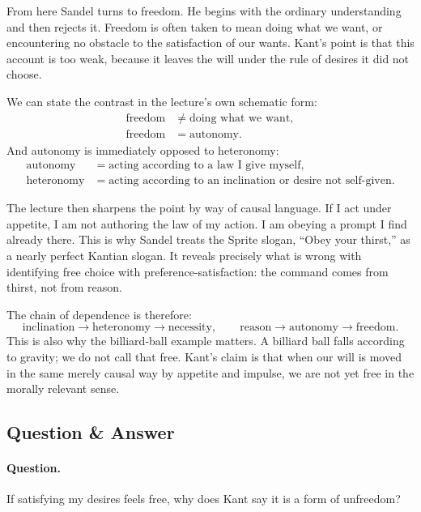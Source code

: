 From here Sandel turns to freedom. He begins with the ordinary understanding and then rejects it. Freedom is often taken to mean doing what we want, or encountering no obstacle to the satisfaction of our wants. Kant's point is that this account is too weak, because it leaves the will under the rule of desires it did not choose.

We can state the contrast in the lecture's own schematic form:
\begin{align}
\text{freedom} &\neq \text{doing what we want},\\
\text{freedom} &= \text{autonomy}.
\end{align}
And autonomy is immediately opposed to heteronomy:
\begin{align}
\text{autonomy} &= \text{acting according to a law I give myself},\\
\text{heteronomy} &= \text{acting according to an inclination or desire not self-given}.
\end{align}

The lecture then sharpens the point by way of causal language. If I act under appetite, I am not authoring the law of my action. I am obeying a prompt I find already there. This is why Sandel treats the Sprite slogan, ``Obey your thirst,'' as a nearly perfect Kantian slogan. It reveals precisely what is wrong with identifying free choice with preference-satisfaction: the command comes from thirst, not from reason.

The chain of dependence is therefore:
\begin{equation}
\text{inclination} \to \text{heteronomy} \to \text{necessity},
\qquad
\text{reason} \to \text{autonomy} \to \text{freedom}.
\end{equation}
This is also why the billiard-ball example matters. A billiard ball falls according to gravity; we do not call that free. Kant's claim is that when our will is moved in the same merely causal way by appetite and impulse, we are not yet free in the morally relevant sense.

\subsection{Question \& Answer}

\paragraph{Question.} If satisfying my desires feels free, why does Kant say it is a form of unfreedom?

